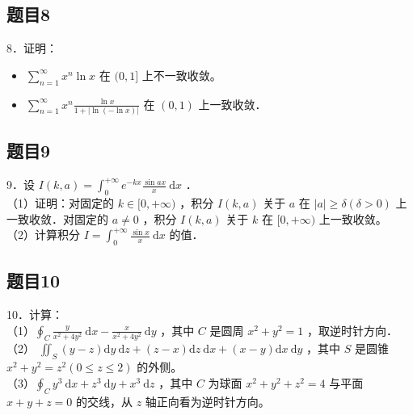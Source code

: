 \documentclass{article}
\begin{document}
\subsection{题目8}
8．证明：

\begin{itemize}
  \item[（1）] \(\sum_{n=1}^{\infty} x^{n} \ln x\) 在 \((0,1]\) 上不一致收敛。
  \item[（2）] \(\sum_{n=1}^{\infty} x^{n} \frac{\ln x}{1+|\ln (-\ln x)|}\) 在 \((0,1)\) 上一致收敛．
\end{itemize}

\subsection{题目9}
9．设 \(I(k, a)=\int_{0}^{+\infty} e^{-k x} \frac{\sin a x}{x} \mathrm{~d} x\) ．\\
（1）证明：对固定的 \(k \in[0,+\infty)\) ，积分 \(I(k, a)\) 关于 \(a\) 在 \(|a| \geq \delta(\delta>0)\) 上一致收敛．对固定的 \(a \neq 0\) ，积分 \(I(k, a)\) 关于 \(k\) 在 \([0,+\infty)\) 上一致收敛。\\
（2）计算积分 \(I=\int_{0}^{+\infty} \frac{\sin x}{x} \mathrm{~d} x\) 的值．

\subsection{题目10}
10．计算：\\
（1）\(\oint_{C} \frac{y}{x^{2}+4 y^{2}} \mathrm{~d} x-\frac{x}{x^{2}+4 y^{2}} \mathrm{~d} y\) ，其中 \(C\) 是圆周 \(x^{2}+y^{2}=1\) ，取逆时针方向．\\
（2） \(\iint_{S}(y-z) \mathrm{d} y \mathrm{~d} z+(z-x) \mathrm{d} z \mathrm{~d} x+(x-y) \mathrm{d} x \mathrm{~d} y\) ，其中 \(S\) 是圆锥 \(x^{2}+y^{2}=z^{2}(0 \leq z \leq 2)\) 的外侧。\\
（3）\(\oint_{C} y^{3} \mathrm{~d} x+z^{3} \mathrm{~d} y+x^{3} \mathrm{~d} z\) ，其中 \(C\) 为球面 \(x^{2}+y^{2}+z^{2}=4\) 与平面 \(x+y+z=0\) 的交线，从 \(z\) 轴正向看为逆时针方向。
\end{document}

